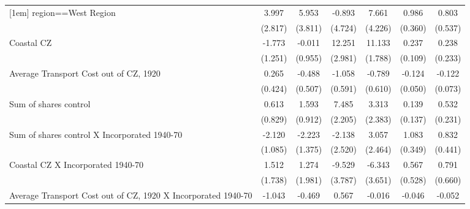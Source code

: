 \begin{table}[htbp]
\begin{tabular}{l*{6}{c}}
[1em]
region==West Region &       3.997         &       5.953         &      -0.893         &       7.661\sym{*}  &       0.986\sym{***}&       0.803         \\
                    &     (2.817)         &     (3.811)         &     (4.724)         &     (4.226)         &     (0.360)         &     (0.537)         \\
[1em]
Coastal CZ          &      -1.773         &      -0.011         &      12.251\sym{***}&      11.133\sym{***}&       0.237\sym{**} &       0.238         \\
                    &     (1.251)         &     (0.955)         &     (2.981)         &     (1.788)         &     (0.109)         &     (0.233)         \\
[1em]
Average Transport Cost out of CZ, 1920&       0.265         &      -0.488         &      -1.058\sym{*}  &      -0.789         &      -0.124\sym{**} &      -0.122\sym{*}  \\
                    &     (0.424)         &     (0.507)         &     (0.591)         &     (0.610)         &     (0.050)         &     (0.073)         \\
[1em]
Sum of shares control&       0.613         &       1.593\sym{*}  &       7.485\sym{***}&       3.313         &       0.139         &       0.532\sym{**} \\
                    &     (0.829)         &     (0.912)         &     (2.205)         &     (2.383)         &     (0.137)         &     (0.231)         \\
[1em]
Sum of shares control X Incorporated 1940-70&      -2.120\sym{*}  &      -2.223         &      -2.138         &       3.057         &       1.083\sym{***}&       0.832\sym{*}  \\
                    &     (1.085)         &     (1.375)         &     (2.520)         &     (2.464)         &     (0.349)         &     (0.441)         \\
[1em]
Coastal CZ X Incorporated 1940-70&       1.512         &       1.274         &      -9.529\sym{**} &      -6.343\sym{*}  &       0.567         &       0.791         \\
                    &     (1.738)         &     (1.981)         &     (3.787)         &     (3.651)         &     (0.528)         &     (0.660)         \\
[1em]
Average Transport Cost out of CZ, 1920 X Incorporated 1940-70&      -1.043\sym{**} &      -0.469         &       0.567         &      -0.016         &      -0.046         &      -0.052         \\

\end{tabular}
\end{table}
